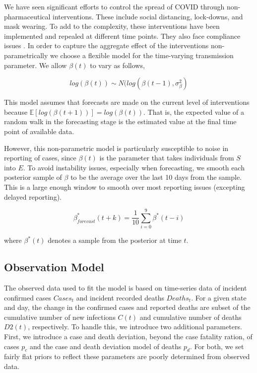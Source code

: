 \documentclass{umassthesis}          %
\begin{document}
We have seen significant efforts to control the spread of COVID through non-pharmaceutical interventions. These include social distancing, lock-downs, and mask wearing. To add to the complexity, these interventions have been implemented and repealed at different time points. They also face compliance issues \cite{simonov2020persuasive}. In order to capture the aggregate effect of the interventions non-parametrically we choose a flexible model for the time-varying transmission parameter.
We allow $\beta(t)$ to vary as follows, 

\begin{equation}
log(\beta(t)) \sim N(log(\beta(t-1), \sigma_{\beta}^2)
\end{equation}

This model assumes that forecasts are made on the current level of interventions because $\mathbb{E}[log(\beta(t+1))] = log(\beta(t))$. That is, the expected value of a random walk in the forecasting stage is the estimated value at the final time point of available data.

However, this non-parametric model is particularly susceptible to noise in reporting of cases, since $\beta(t)$ is the parameter that takes individuals from $S$ into $E$. To avoid instability issues, especially when forecasting, we smooth each posterior sample of $\beta$ to be the average over the last 10 days from the sample. This is a large enough window to smooth over most reporting issues (excepting delayed reporting). 

\begin{equation}
\beta^*_{forecast}(t+k) = \frac{1}{10}\sum_{i=0}^{9}\beta^*(t-i)
\end{equation}

where $\beta^*(t)$ denotes a sample from the posterior at time $t$.

% 
 \subsection{Observation Model}
 
 The observed data used to fit the model is based on time-series data of incident confirmed cases $Cases_{t}$ and incident recorded deaths $Deaths_{t}$. 
For a given state and day, the change in the  confirmed cases and reported deaths are subset of the cumulative number of new infections $C(t)$ and cumulative number of deaths $D2(t)$, respectively. To handle this, we introduce two additional parameters. First, we introduce a case and death deviation, beyond the case fatality ration, of cases $p_c$ and the case and death deviation model of deaths $p_d$. For both, we set fairly flat priors to reflect these parameters are poorly determined from observed data.
\end{document}
